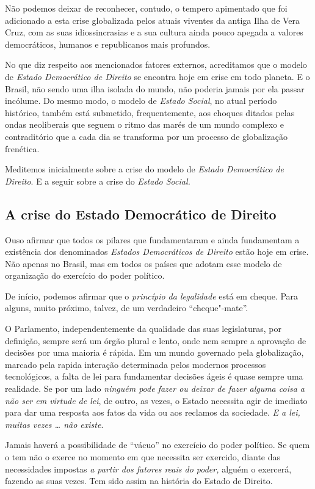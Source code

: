 Não podemos deixar de reconhecer, contudo, o tempero apimentado que foi
adicionado a esta crise globalizada pelos atuais viventes da antiga Ilha
de Vera Cruz, com as suas idiossincrasias e a sua cultura ainda pouco
apegada a valores democráticos, humanos e republicanos mais profundos.

No que diz respeito aos mencionados fatores externos, acreditamos que o
modelo de \emph{Estado Democrático de Direito} se encontra hoje em crise
em todo planeta. E o Brasil, não sendo uma ilha isolada do mundo, não
poderia jamais por ela passar incólume. Do mesmo modo, o modelo de
\emph{Estado Social}, no atual período histórico, também está submetido,
frequentemente, aos choques ditados pelas ondas neoliberais que seguem o
ritmo das marés de um mundo complexo e contraditório que a cada dia se
transforma por um processo de globalização frenética.

Meditemos inicialmente sobre a crise do modelo de \emph{Estado
Democrático de Direito}. E a seguir sobre a crise do \emph{Estado
Social.}

\subsection{A crise do Estado Democrático de Direito}

Ouso afirmar que todos os pilares que fundamentaram e ainda fundamentam
a existência dos denominados \emph{Estados Democráticos de Direito}
estão hoje em crise. Não apenas no Brasil, mas em todos os países que
adotam esse modelo de organização do exercício do poder político.

De início, podemos afirmar que o \emph{princípio da legalidade} está em
cheque. Para alguns, muito próximo, talvez, de um verdadeiro
``cheque"-mate''.

O Parlamento, independentemente da qualidade das suas legislaturas, por
definição, sempre será um órgão plural e lento, onde nem sempre a
aprovação de decisões por uma maioria é rápida. Em um mundo governado
pela globalização, marcado pela rapida interação determinada pelos
modernos processos tecnológicos, a falta de lei para fundamentar
decisões ágeis é quase sempre uma realidade. Se por um lado
\emph{ninguém pode fazer ou deixar de fazer alguma coisa a não ser em
virtude de lei}, de outro, as vezes, o Estado necessita agir de imediato
para dar uma resposta aos fatos da vida ou aos reclamos da sociedade.
\emph{E a lei, muitas vezes \ldots{} não existe}.

Jamais haverá a possibilidade de ``vácuo'' no exercício do poder
político. Se quem o tem não o exerce no momento em que necessita ser
exercido, diante das necessidades impostas \emph{a partir dos fatores
reais do poder,} alguém o exercerá, fazendo as suas vezes. Tem sido
assim na história do Estado de Direito.

